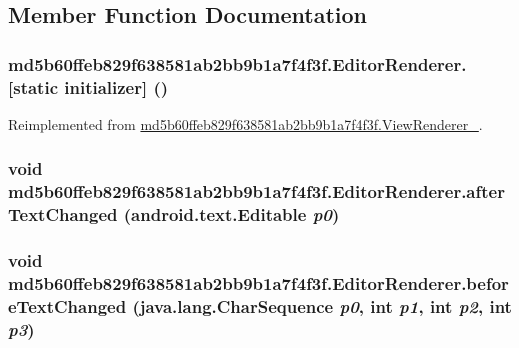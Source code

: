\subsection{Member Function Documentation}
\hypertarget{classmd5b60ffeb829f638581ab2bb9b1a7f4f3f_1_1_editor_renderer_baf0db3252461c188060b182e6b8fbb7}{
\subsubsection[{[static initializer]}]{\setlength{\rightskip}{0pt plus 5cm}md5b60ffeb829f638581ab2bb9b1a7f4f3f.EditorRenderer.\mbox{[}static initializer\mbox{]} ()}}
\label{classmd5b60ffeb829f638581ab2bb9b1a7f4f3f_1_1_editor_renderer_baf0db3252461c188060b182e6b8fbb7}




Reimplemented from \hyperlink{classmd5b60ffeb829f638581ab2bb9b1a7f4f3f_1_1_view_renderer__2_a0898cf56fa9a49b653470eaf1608e77}{md5b60ffeb829f638581ab2bb9b1a7f4f3f.ViewRenderer\_}.\hypertarget{classmd5b60ffeb829f638581ab2bb9b1a7f4f3f_1_1_editor_renderer_7cc8b388893791b82894b01e4627508d}{
\subsubsection[{afterTextChanged}]{\setlength{\rightskip}{0pt plus 5cm}void md5b60ffeb829f638581ab2bb9b1a7f4f3f.EditorRenderer.afterTextChanged (android.text.Editable {\em p0})}}
\label{classmd5b60ffeb829f638581ab2bb9b1a7f4f3f_1_1_editor_renderer_7cc8b388893791b82894b01e4627508d}


\hypertarget{classmd5b60ffeb829f638581ab2bb9b1a7f4f3f_1_1_editor_renderer_96753b901a17611aedda80e2aa4801f8}{
\subsubsection[{beforeTextChanged}]{\setlength{\rightskip}{0pt plus 5cm}void md5b60ffeb829f638581ab2bb9b1a7f4f3f.EditorRenderer.beforeTextChanged (java.lang.CharSequence {\em p0}, \/  int {\em p1}, \/  int {\em p2}, \/  int {\em p3})}}
\label{classmd5b60ffeb829f638581ab2bb9b1a7f4f3f_1_1_editor_renderer_96753b901a17611aedda80e2aa4801f8}


